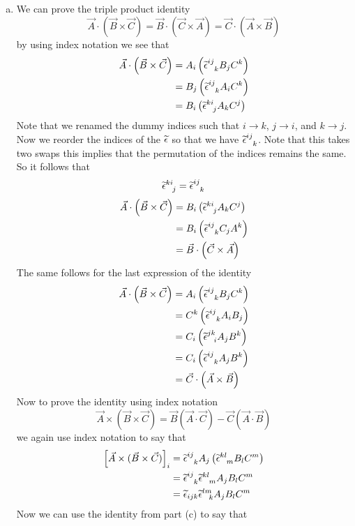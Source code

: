 \documentclass[11pt]{article}
\numberwithin{equation}{section}
\begin{document}
\begin{enumerate}[(a)]
\item
We can prove the triple product identity 
$$\vec{A}\cdot\left(\vec{B}\times\vec{C}\right) = \vec{B}\cdot\left(\vec{C}\times\vec{A}\right) = \vec{C}\cdot\left(\vec{A}\times\vec{B}\right)$$
by using index notation we see that 
\begin{align*}
\vec{A}\cdot\left(\vec{B}\times\vec{C}\right) &= A_i\left(\widetilde{\epsilon}^{ij}_{\ \ k}B_jC^k\right)\\
&= B_j\left(\widetilde{\epsilon}^{ij}_{\ \ k}A_iC^k\right)\\
&= B_i\left(\widetilde{\epsilon}^{ki}_{\ \ j}A_kC^j\right)
\end{align*}
Note that we renamed the dummy indices such that $i\rightarrow k$, $j\rightarrow i$, and $k\rightarrow j$. Now we reorder the indices of the $\widetilde{\epsilon}$ so that we have $\widetilde{\epsilon}^{ij}_{\ \ k}$. Note that this takes two swaps this implies that the permutation of the indices remains the same. So it follows that
$$\widetilde{\epsilon}^{ki}_{\ \ j} = \widetilde{\epsilon}^{ij}_{\ \ k}$$
\begin{align*}
\vec{A}\cdot\left(\vec{B}\times\vec{C}\right) &= B_i\left(\widetilde{\epsilon}^{ki}_{\ \ j}A_kC^j\right)\\
&= B_i\left(\widetilde{\epsilon}^{ij}_{\ \ k}C_jA^k\right)\\
&= \vec{B}\cdot\left(\vec{C}\times\vec{A}\right) 
\end{align*}
The same follows for the last expression of the identity
\begin{align*}
\vec{A}\cdot\left(\vec{B}\times\vec{C}\right) &= A_i\left(\widetilde{\epsilon}^{ij}_{\ \ k}B_jC^k\right)\\
&= C^k\left(\widetilde{\epsilon}^{ij}_{\ \ k}A_iB_j\right)\\
&= C_i\left(\widetilde{\epsilon}^{jk}_{\ \ i}A_jB^k\right)\\
&= C_i\left(\widetilde{\epsilon}^{ij}_{\ \ k}A_jB^k\right)\\
&= \vec{C}\cdot\left(\vec{A}\times\vec{B}\right) 
\end{align*}
Now to prove the identity using index notation
$$\vec{A}\times(\vec{B}\times\vec{C}) = \vec{B}\left(\vec{A}\cdot\vec{C}\right) - \vec{C}\left(\vec{A}\cdot\vec{B}\right)$$
we again use index notation to say that
\begin{align*}
\left[\vec{A}\times(\vec{B}\times\vec{C})\right]_i &= \levi^{ij}_{\ \ k}A_j\left(\levi^{kl}_{\ \ m}B_lC^m\right)\\
&= \levi^{ij}_{\ \ k}\levi^{kl}_{\ \ m}A_jB_lC^m\\
&= \levi_{ijk}\levi^{lm}_{\ \ k}A_jB_lC^m
\end{align*}
Now we can use the identity from part (c) to say that

\end{enumerate}
\end{document}
